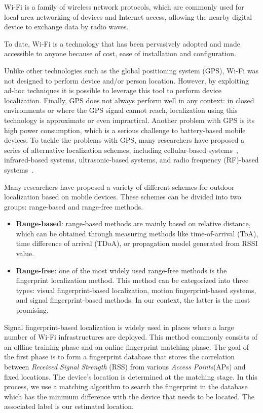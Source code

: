 Wi-Fi is a family of wireless network protocols, which are commonly used for local area networking of devices and Internet access, allowing the
nearby digital device to exchange data by radio waves.

To date, Wi-Fi is a technology that has been pervasively adopted and made accessible to anyone because of cost, ease of installation and
configuration.

Unlike other technologies such as the global positioning system (GPS), Wi-Fi was not designed to perform device and/or person location. However, by
exploiting ad-hoc techniques it is possible to leverage this tool to perform device localization. Finally, GPS does not always perform well in any
context: in closed environments or where the GPS signal cannot reach, localization using this technology is approximate or even impractical. Another
problem with GPS is its high power consumption, which is a serious challenge to battery-based mobile devices. To tackle the problems with GPS, many
researchers have proposed a series of alternative localization schemes, including cellular-based systems~\cite{ibrahim2010cellsense}, infrared-based
systems, ultrasonic-based systems, and radio frequency (RF)-based systems~\cite{bahl2000radar, youssef2002probabilistic}.

Many researchers have proposed a variety of different schemes for outdoor localization based on mobile devices. These schemes can be divided into two
groups: range-based and range-free methods.

\begin{itemize}
	\item \textbf{Range-based}: range-based methods are mainly based on relative distance, which can be obtained through measuring methods like
	      time-of-arrival (ToA), time difference of arrival (TDoA), or propagation model generated from RSSI value.
	\item \textbf{Range-free}: one of the most widely used range-free methods is the fingerprint localization method.
	      This method can be categorized into three types:
	      visual fingerprint-based localization, motion fingerprint-based systems, and signal fingerprint-based methods.
	      In our context, the latter is the most promising.
\end{itemize}

Signal fingerprint-based localization is widely used in places where a large number of Wi-Fi infrastructures are deployed. This method commonly
consists of an offline training phase and an online fingerprint matching phase. The goal of the first phase is to form a fingerprint database that
stores the correlation between \textit{Received Signal Strength} (RSS) from various \textit{Access Points}(APs) and fixed locations. The device's
location is determined at the matching stage. In this process, we use a matching algorithm to search the fingerprint in the database which has the
minimum difference with the device that needs to be located. The associated label is our estimated location.

